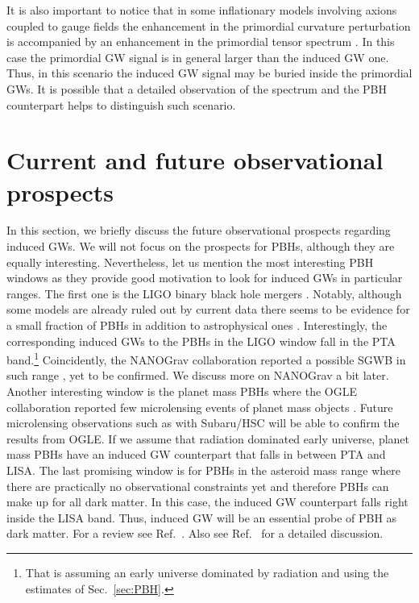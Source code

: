 \documentclass[a4paper,11pt]{article}
\numberwithin{equation}{section}
\begin{document}
It is also important to notice that in some inflationary models involving axions coupled to gauge fields the enhancement in the primordial curvature perturbation is accompanied by an enhancement in the primordial tensor spectrum \cite{Peloso:2016gqs,Garcia-Bellido:2016dkw,Garcia-Bellido:2017aan}. In this case the primordial GW signal is in general larger than the induced GW one. Thus, in this scenario the induced GW signal may be buried inside the primordial GWs. It is possible that a detailed observation of the spectrum and the PBH counterpart helps to distinguish such scenario.




\section{Current and future observational prospects \label{sec:observations}}

In this section, we briefly discuss the future observational prospects regarding induced GWs. We will not focus on the prospects for PBHs, although they are equally interesting. Nevertheless, let us mention the most interesting PBH windows as they provide good motivation to look for induced GWs in particular ranges.  The first one is the LIGO binary black hole mergers \cite{Nakamura:1997sm,Sasaki:2016jop,Bird:2016dcv,Ali-Haimoud:2017rtz}. Notably, although some models are already ruled out by current data \cite{Hall:2020daa} there seems to be evidence for a small fraction of PBHs in addition to astrophysical ones \cite{DeLuca:2021wjr,Franciolini:2021tla}. Interestingly, the corresponding induced GWs to the PBHs in the LIGO window fall in the PTA band.\footnote{That is assuming an early universe dominated by radiation and using the estimates of Sec.~\ref{sec:PBH}.} Coincidently, the NANOGrav collaboration reported a possible SGWB in such range \cite{Arzoumanian:2020vkk}, yet to be confirmed. We discuss more on NANOGrav a bit later. Another interesting window is the planet mass PBHs \cite{Niikura:2019kqi} where the OGLE collaboration reported few microlensing events of planet mass objects \cite{2017Natur.548..183M}. Future microlensing observations such as with Subaru/HSC \cite{Sugiyama:2020roc} will be able to confirm the results from OGLE. If we assume that radiation dominated early universe, planet mass PBHs have an induced GW counterpart that falls in between PTA and LISA. The last promising window is for PBHs in the asteroid mass range where there are practically no observational constraints yet \cite{Sasaki:2018dmp,Carr:2020gox} and therefore PBHs can make up for all dark matter. In this case, the induced GW counterpart falls right inside the LISA band. Thus, induced GW will be an essential probe of PBH as dark matter. For a review see Ref.~\cite{Yuan:2021qgz}. Also see Ref.~\cite{Wang:2019kaf} for a detailed discussion.
\end{document}
